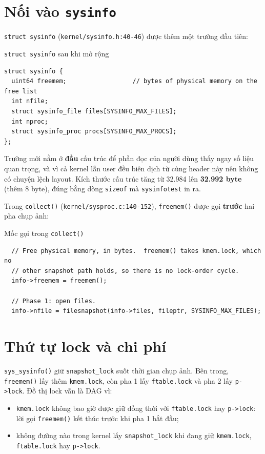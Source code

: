 \section{Nối vào \texttt{sysinfo}}

\texttt{struct sysinfo} (\texttt{kernel/sysinfo.h:40-46}) được thêm một trường đầu tiên:

\begin{codebox}[sysinfoStruct]{\texttt{struct sysinfo} sau khi mở rộng}
    \begin{verbatim}
struct sysinfo {
  uint64 freemem;                  // bytes of physical memory on the free list
  int nfile;
  struct sysinfo_file files[SYSINFO_MAX_FILES];
  int nproc;
  struct sysinfo_proc procs[SYSINFO_MAX_PROCS];
};
    \end{verbatim}
\end{codebox}

Trường mới nằm ở \textbf{đầu} cấu trúc để phần đọc của người dùng thấy ngay số liệu quan trọng, và vì cả kernel lẫn user đều biên dịch từ cùng header này nên không có chuyện lệch layout. Kích thước cấu trúc tăng từ 32.984 lên \textbf{32.992 byte} (thêm 8 byte), đúng bằng dòng \texttt{sizeof} mà \texttt{sysinfotest} in ra.

Trong \texttt{collect()} (\texttt{kernel/sysproc.c:140-152}), \texttt{freemem()} được gọi \textbf{trước} hai pha chụp ảnh:

\begin{codebox}[collectFreemem]{Mốc gọi trong \texttt{collect()}}
    \begin{verbatim}
  // Free physical memory, in bytes.  freemem() takes kmem.lock, which no
  // other snapshot path holds, so there is no lock-order cycle.
  info->freemem = freemem();

  // Phase 1: open files.
  info->nfile = filesnapshot(info->files, fileptr, SYSINFO_MAX_FILES);
    \end{verbatim}
\end{codebox}

\section{Thứ tự lock và chi phí}

\texttt{sys\_sysinfo()} giữ \texttt{snapshot\_lock} suốt thời gian chụp ảnh. Bên trong, \texttt{freemem()} lấy thêm \texttt{kmem.lock}, còn pha 1 lấy \texttt{ftable.lock} và pha 2 lấy \texttt{p->lock}. Đồ thị lock vẫn là DAG vì:

\begin{itemize}[itemsep=0pt, topsep=2.5pt, leftmargin=1.5cm]
    \item \texttt{kmem.lock} không bao giờ được giữ đồng thời với \texttt{ftable.lock} hay \texttt{p->lock}: lời gọi \texttt{freemem()} kết thúc trước khi pha 1 bắt đầu;
    \item không đường nào trong kernel lấy \texttt{snapshot\_lock} khi đang giữ \texttt{kmem.lock}, \texttt{ftable.lock} hay \texttt{p->lock}.
\end{itemize}

